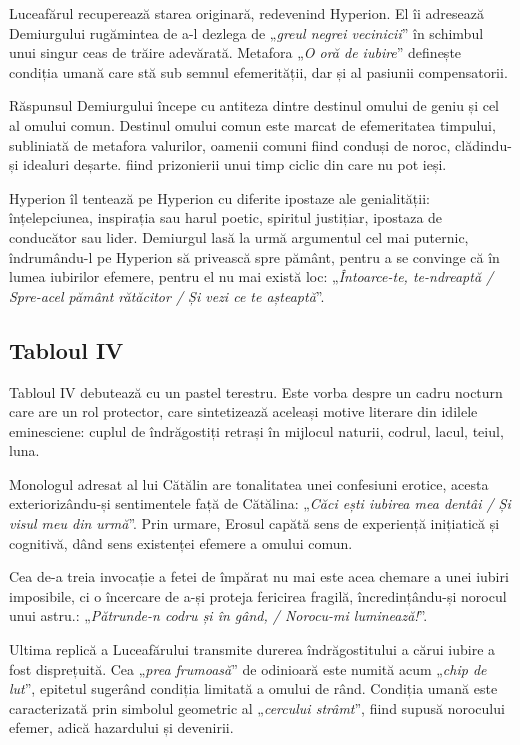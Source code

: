 \documentclass{article}
\newcommand{\qu}[1]{„\emph{#1}”}
\begin{document}
Luceafărul recuperează starea originară, redevenind Hyperion. El îi adresează Demiurgului rugămintea de a-l dezlega de \qu{greul negrei vecinicii} în schimbul unui singur ceas de trăire adevărată. Metafora \qu{O oră de iubire} definește condiția umană care stă sub semnul efemerității, dar și al pasiunii compensatorii.

Răspunsul Demiurgului începe cu antiteza dintre destinul omului de geniu și cel al omului comun. Destinul omului comun este marcat de efemeritatea timpului, subliniată de metafora valurilor, oamenii comuni fiind conduși de noroc, clădindu-și idealuri deșarte. fiind prizonierii unui timp ciclic din care nu pot ieși.

Hyperion îl tentează pe Hyperion cu diferite ipostaze ale genialității: înțelepciunea, inspirația sau harul poetic, spiritul justițiar, ipostaza de conducător sau lider. Demiurgul lasă la urmă argumentul cel mai puternic, îndrumându-l pe Hyperion să privească spre pământ, pentru a se convinge că în lumea iubirilor efemere, pentru el nu mai există loc: \qu{Întoarce-te, te-ndreaptă / Spre-acel pământ rătăcitor / Și vezi ce te așteaptă}.

\subsection{Tabloul IV}
Tabloul IV debutează cu un pastel terestru. Este vorba despre un cadru nocturn care are un rol protector, care sintetizează aceleași motive literare din idilele eminesciene: cuplul de îndrăgostiți retrași în mijlocul naturii, codrul, lacul, teiul, luna.

Monologul adresat al lui Cătălin are tonalitatea unei confesiuni erotice, acesta exteriorizându-și sentimentele față de Cătălina: \qu{Căci ești iubirea mea dentâi / Și visul meu din urmă}. Prin urmare, Erosul capătă sens de experiență inițiatică și cognitivă, dând sens existenței efemere a omului comun.

Cea de-a treia invocație a fetei de împărat nu mai este acea chemare a unei iubiri imposibile, ci o încercare de a-și proteja fericirea fragilă, încredințându-și norocul unui astru.: \qu{Pătrunde-n codru și în gând, / Norocu-mi luminează!}.

Ultima replică a Luceafărului transmite durerea îndrăgostitului a cărui iubire a fost disprețuită. Cea \qu{prea frumoasă} de odinioară este numită acum \qu{chip de lut}, epitetul sugerând condiția limitată a omului de rând. Condiția umană este caracterizată prin simbolul geometric al \qu{cercului strâmt}, fiind supusă norocului efemer, adică hazardului și devenirii.
\end{document}

